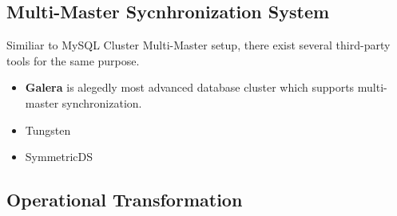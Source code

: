 \subsection{Multi-Master Sycnhronization System}
Similiar to MySQL Cluster Multi-Master setup, there exist several third-party tools for the same purpose.
\begin{itemize}
\item \textbf{Galera}\cite{galera} is alegedly most advanced database cluster which supports multi-master synchronization. 
\item Tungsten
\item SymmetricDS
\end{itemize}


\subsection{Operational Transformation}
